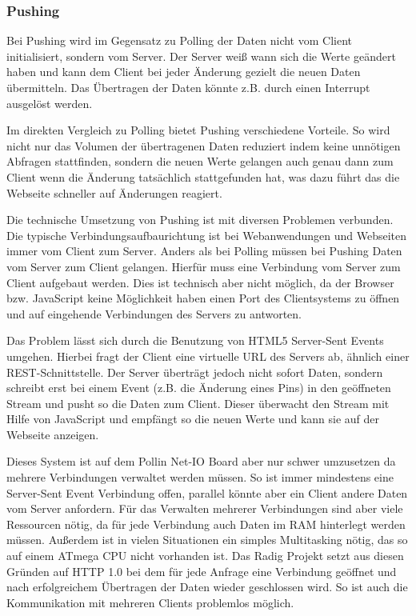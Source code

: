 \subsubsection{Pushing}
Bei Pushing wird im Gegensatz zu Polling der Daten nicht vom Client initialisiert, sondern
vom Server. Der Server weiß wann sich die Werte geändert haben und kann dem Client bei
jeder Änderung gezielt die neuen Daten übermitteln. Das Übertragen der Daten
könnte z.B. durch einen Interrupt ausgelöst werden.

Im direkten Vergleich zu Polling bietet Pushing verschiedene Vorteile. So wird nicht nur
das Volumen der übertragenen Daten reduziert indem keine unnötigen Abfragen stattfinden,
sondern die neuen Werte gelangen auch genau dann zum Client wenn die Änderung tatsächlich
stattgefunden hat, was dazu führt das die Webseite schneller auf Änderungen reagiert.

Die technische Umsetzung von Pushing ist mit diversen Problemen verbunden. Die typische
Verbindungsaufbaurichtung ist bei Webanwendungen und Webseiten immer vom Client zum
Server. Anders als bei Polling müssen bei Pushing Daten vom Server zum Client gelangen.
Hierfür muss eine Verbindung vom Server zum Client aufgebaut werden. Dies ist technisch
aber nicht möglich, da der Browser bzw. JavaScript keine Möglichkeit haben einen Port des
Clientsystems zu öffnen und auf eingehende Verbindungen des Servers zu antworten.

Das Problem lässt sich durch die Benutzung von HTML5 Server-Sent Events umgehen. Hierbei
fragt der Client eine virtuelle URL des Servers ab, ähnlich einer REST-Schnittstelle. Der
Server überträgt jedoch nicht sofort Daten, sondern schreibt erst bei einem Event (z.B.
die Änderung eines Pins) in den geöffneten Stream und pusht so die Daten zum Client.
Dieser überwacht den Stream mit Hilfe von JavaScript und empfängt so die neuen Werte und
kann sie auf der Webseite anzeigen.

Dieses System ist auf dem Pollin Net-IO Board aber nur schwer umzusetzen da mehrere
Verbindungen verwaltet werden müssen. So ist immer mindestens eine Server-Sent Event
Verbindung offen, parallel könnte aber ein Client andere Daten vom Server anfordern. Für
das Verwalten mehrerer Verbindungen sind aber viele Ressourcen nötig, da für jede
Verbindung auch Daten im RAM hinterlegt werden müssen. Außerdem ist in vielen Situationen
ein simples Multitasking nötig, das so auf einem ATmega CPU nicht vorhanden ist. Das Radig
Projekt setzt aus diesen Gründen auf HTTP 1.0 bei dem für jede Anfrage eine Verbindung
geöffnet und nach erfolgreichem Übertragen der Daten wieder geschlossen wird. So ist auch
die Kommunikation mit mehreren Clients problemlos möglich.

